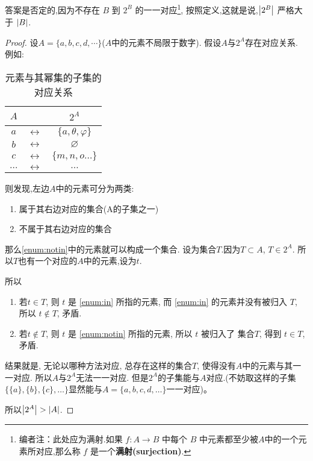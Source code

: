 \documentclass[UTF8]{mathrep}
\begin{document}
答案是否定的,因为不存在 $B$ 到 $2^B$ 的一一对应\footnote{编者注：此处应为满射.如果 $f: A \to B$ 中每个 $B$ 中元素都至少被$A$中的一个元素所对应,那么称 $f$ 是一个\textbf{满射(surjection)}.},
按照定义,这就是说,$\left\lvert 2^B \right\rvert$ 严格大于 $\left\lvert B \right\rvert$.

\begin{proof}
	设$A= \{a,b,c,d,\cdots\}$($A$中的元素不局限于数字).
	假设$A$与$2^{A}$存在对应关系.
	例如:
	\begin{table}
		\begin{center}

			\begin{tabular}{ccc}
				\toprule
				$A$      & ~                 & $2^{A}$                  \\
				\midrule
				$a$      & $\leftrightarrow$ & $\{a,\theta ,\varphi \}$ \\
				$b$      & $\leftrightarrow$ & $\varnothing$            \\
				$c$      & $\leftrightarrow$ & $\{m,n,o \ldots \}$      \\
				$\ldots$ & $\leftrightarrow$ & $\ldots$                 \\
				\bottomrule
			\end{tabular}
			\caption{元素与其幂集的子集的对应关系}

		\end{center}
	\end{table}
	则发现,左边$A$中的元素可分为两类:
	\begin{enumerate}
		\item \label{enum:in}属于其右边对应的集合(A的子集之一)
		\item \label{enum:notin}不属于其右边对应的集合
	\end{enumerate}
	那么\cref{enum:notin}中的元素就可以构成一个集合.
	设为集合$T$.因为$T\subset A$, $T \in 2^{A} $.
	所以$T$也有一个对应的$A$中的元素,设为$t$.

	所以
	\begin{enumerate}
		\item 若$t \in T$, 则 $t$ 是 \cref{enum:in} 所指的元素, 而 \cref{enum:in} 的元素并没有被归入 $T$, 所以 $t \not\in T$, 矛盾.
		\item 若$t \not\in T$, 则 $t$ 是 \cref{enum:notin} 所指的元素, 所以 $t$ 被归入了 集合$T$, 得到 $t \in T$, 矛盾.
	\end{enumerate}

	结果就是, 无论以哪种方法对应, 总存在这样的集合$T$, 使得没有$A$中的元素与其一一对应.
	所以$A$与$2^{A}$无法一一对应.
	但是$2^{A} $的子集能与$A$对应.(不妨取这样的子集$ \{ \{a\},\{b\},\{c\}, \ldots \}  $显然能与$A = \{a, b, c, d, \ldots \} $一一对应)。

	所以$\left\lvert 2^{A} \right\rvert> \left\lvert A \right\rvert$.

\end{proof}
\end{document}
